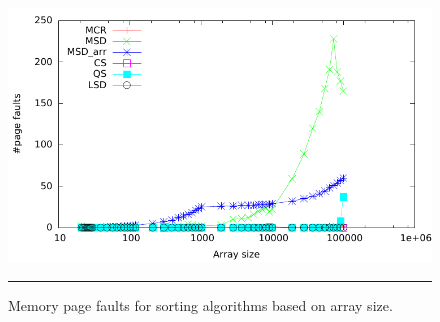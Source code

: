 \begin{figure}[htbp]
	\centering
		\includegraphics[width=\textwidth]{./Figures/Project2b/Page_faults.pdf}
		\rule{35em}{0.5pt}
	\caption[Page faults]{
	Memory page faults for sorting algorithms based on array size.
	}
	\label{fig:Page_faults_p2b}
\end{figure}



